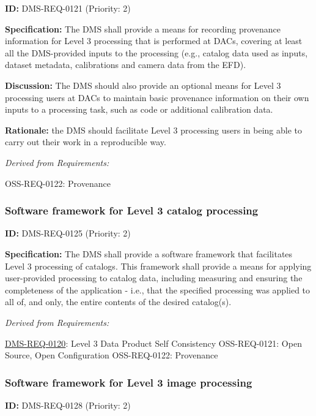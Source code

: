 \documentclass[SE,toc,lsstdraft]{lsstdoc}
\begin{document}
\label{DMS-REQ-0121}
\textbf{ID:} DMS-REQ-0121 (Priority: 2)

\textbf{Specification:} The DMS shall provide a means for recording provenance information for Level 3 processing that is performed at DACs, covering at least all the DMS-provided inputs to the processing (e.g., catalog data used as inputs, dataset metadata, calibrations and camera data from the EFD).

\textbf{Discussion:} The DMS should also provide an optional means for Level 3 processing users at DACs to maintain basic provenance information on their own inputs to a processing task, such as code or additional calibration data.

\textbf{Rationale:} the DMS should facilitate Level 3 processing users in being able to carry out their work in a reproducible way.

\emph{Derived from Requirements:}

OSS-REQ-0122:
Provenance \newline

\subsubsection{Software framework for Level 3 catalog processing}

\label{DMS-REQ-0125}
\textbf{ID:} DMS-REQ-0125 (Priority: 2)

\textbf{Specification:} The DMS shall provide a software framework that facilitates Level 3 processing of catalogs.  This framework shall provide a means for applying user-provided processing to catalog data, including measuring and ensuring the completeness of the application - i.e., that the specified processing was applied to all of, and only, the entire contents of the desired catalog(s).

\emph{Derived from Requirements:}

\hyperref[DMS-REQ-0120]{DMS-REQ-0120}:
Level 3 Data Product Self Consistency \newline
OSS-REQ-0121:
Open Source, Open Configuration \newline
OSS-REQ-0122:
Provenance \newline

\subsubsection{Software framework for Level 3 image processing}

\label{DMS-REQ-0128}
\textbf{ID:} DMS-REQ-0128 (Priority: 2)
\end{document}
